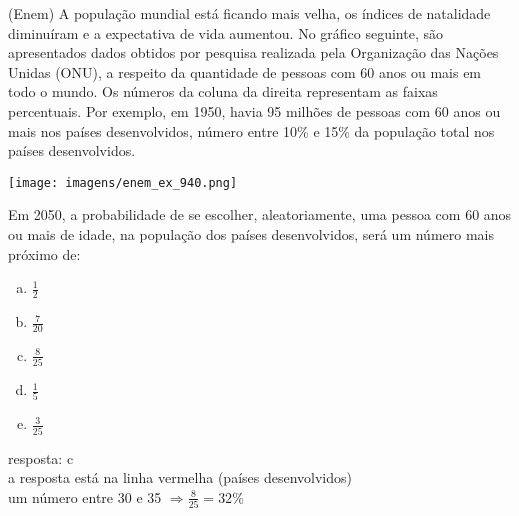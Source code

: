 \begin{ex}
(Enem) A população mundial está ficando mais velha, os índices de natalidade diminuíram e a expectativa de vida aumentou. No gráfico seguinte, são apresentados dados obtidos por pesquisa realizada pela Organização das Nações Unidas (ONU), a respeito da quantidade de pessoas com 60 anos ou mais em todo o mundo. Os números da coluna da direita representam as faixas percentuais. Por exemplo, em 1950, havia 95 milhões de pessoas com 60 anos ou mais nos países desenvolvidos, número entre 10\% e 15\% da população total nos países desenvolvidos. 
\begin{center}
\texttt{[image: imagens/enem\_ex\_940.png]}
\end{center}
Em 2050, a probabilidade de se escolher, aleatoriamente, uma pessoa com 60 anos ou mais de idade, na população dos países desenvolvidos, será um número mais próximo de:
   \begin{enumerate}[(a)]
   \item $\frac{1}{2}$
   \item $\frac{7}{20}$
   \item $\frac{8}{25}$
   \item $\frac{1}{5}$
   \item $\frac{3}{25}$
   \end{enumerate}
     \begin{sol}
      resposta: c \\
      a resposta está na linha vermelha (países desenvolvidos) \\
      um número entre 30 e 35 $\Longrightarrow \frac{8}{25}=32\%$
     \end{sol}
\end{ex}